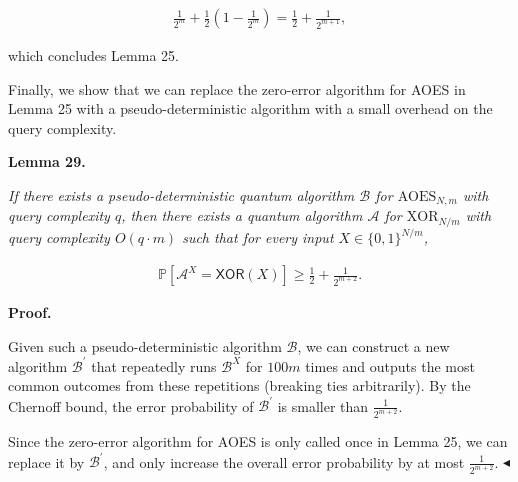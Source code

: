 \documentclass[10pt,a4paper]{article}
\begin{document}
\[\begin{gathered}
\frac{1}{2^{m}}+\frac{1}{2}(1-\frac{1}{2^{m}})=\frac{1}{2}+\frac{1}{2^{m+1}},
\end{gathered}\]


which concludes Lemma 25.\par




Finally, we show that we can replace the zero-error algorithm for AOES in Lemma 25 with a pseudo-deterministic algorithm with a small overhead on the query complexity.\par





\par\medskip\noindent\textbf{
\textbf{Lemma 29}\textbf{.}
}\par



\emph{If there exists a pseudo-deterministic quantum algorithm $\mathcal{B}$ for ${\text{AOES}}_{N,m}$ with query complexity $q$, then there exists a quantum algorithm $\mathcal{A}$ for ${\text{XOR}}_{N/m}$ with query complexity $O(q\cdot m)$ such that for every input $X\in\{0,1\}^{N/m}$,}\par


\[\begin{gathered}
\mathbb{P}\left[\mathcal{A}^{X}=\mathsf{XOR}(X)\right]\geq\frac{1}{2}+\frac{1}{2^{m+2}}.
\end{gathered}\]







\par\medskip\noindent\textbf{Proof.}\par




Given such a pseudo-deterministic algorithm $\mathcal{B}$, we can construct a new algorithm $\mathcal{B}^{\prime}$ that repeatedly runs $\mathcal{B}^{X}$ for $100m$ times and outputs the most common outcomes from these repetitions (breaking ties arbitrarily).
By the Chernoff bound, the error probability of $\mathcal{B}^{\prime}$ is smaller than $\frac{1}{2^{m+2}}$.\par




Since the zero-error algorithm for AOES is only called once in Lemma 25, we can replace it by $\mathcal{B^{\prime}}$, and only increase the overall error probability by at most $\frac{1}{2^{m+2}}$.
$\blacktriangleleft$\par
\end{document}
